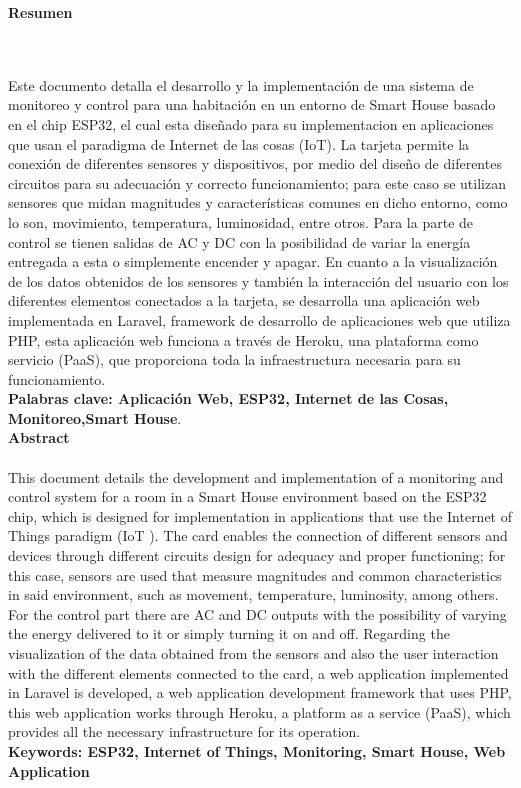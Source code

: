 \newpage
\thispagestyle{empty} \textbf{}\normalsize
\textbf{\LARGE Resumen}
\markboth{}{}
\\\\
Este documento detalla el desarrollo y la implementación de una sistema de monitoreo y control para una habitación en un entorno de Smart House basado en el chip ESP32, el cual esta diseñado para su implementacion en aplicaciones que usan el paradigma de Internet de las cosas (IoT). La tarjeta permite la conexión de diferentes sensores y dispositivos, por medio del diseño de diferentes circuitos para su adecuación y correcto funcionamiento; para este caso se utilizan sensores que midan magnitudes y características comunes en dicho entorno, como lo son, movimiento, temperatura, luminosidad, entre otros. Para la parte de control se tienen salidas de AC y DC con la posibilidad de variar la energía entregada a esta o simplemente encender y apagar. En cuanto a la visualización de los datos obtenidos de los sensores y también la interacción del usuario con los diferentes elementos conectados a la tarjeta, se desarrolla una aplicación web implementada en Laravel, framework de desarrollo de aplicaciones web que utiliza PHP, esta aplicación web funciona a través de Heroku, una plataforma como servicio (PaaS), que proporciona toda la infraestructura necesaria para su funcionamiento.\\
\textbf{\small Palabras clave: Aplicación Web, ESP32, Internet de las Cosas, Monitoreo,Smart House}.\\[1.0cm]
\textbf{\LARGE Abstract}\\\\
This document details the development and implementation of a monitoring and control system for a room in a Smart House environment based on the ESP32 chip, which is designed for implementation in applications that use the Internet of Things paradigm (IoT ). The card enables the connection of different sensors and devices through different circuits design for adequacy and proper functioning; for this case, sensors are used that measure magnitudes and common characteristics in said environment, such as movement, temperature, luminosity, among others. For the control part there are AC and DC outputs with the possibility of varying the energy delivered to it or simply turning it on and off. Regarding the visualization of the data obtained from the sensors and also the user interaction with the different elements connected to the card, a web application implemented in Laravel is developed, a web application development framework that uses PHP, this web application works through Heroku, a platform as a service (PaaS), which provides all the necessary infrastructure for its operation.\\[1.0cm]
\textbf{\small Keywords: ESP32, Internet of Things, Monitoring, Smart House, Web Application}